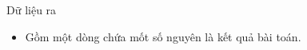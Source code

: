 Dữ liệu ra
\begin{itemize}
	\item      Gồm một dòng chứa mốt số nguyên là kết quả bài toán.    
\end{itemize}
